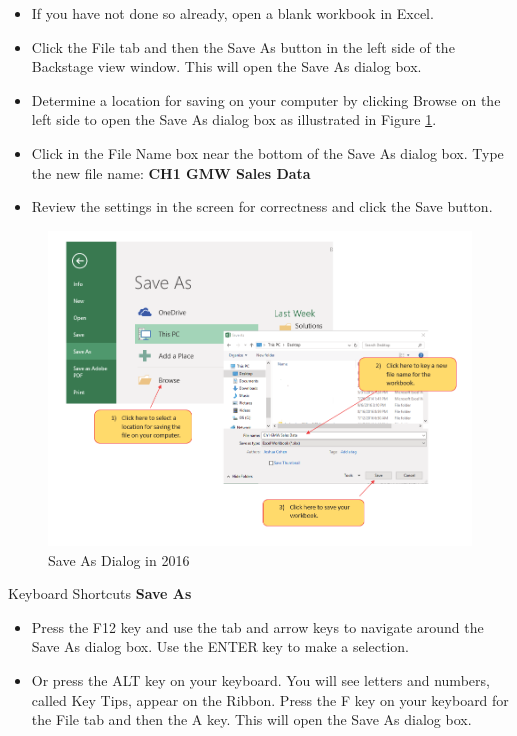 \begin{itemize}
	\item If you have not done so already, open a blank workbook in Excel.
	\item Click the File tab and then the Save As button in the left side of the Backstage view window. This will open the Save As dialog box.
	\item Determine a location for saving on your computer by clicking Browse on the left side to open the Save As dialog box as illustrated in Figure \ref{01:fig12}.
	\item Click in the File Name box near the bottom of the Save As dialog box. Type the new file name: \textbf{CH1 GMW Sales Data}
	\item Review the settings in the screen for correctness and click the Save button.
\end{itemize}

\begin{figure}[H]
	\centering
	\includegraphics[width=\maxwidth{.95\linewidth}]{gfx/ch01_fig12}
	\caption{Save As Dialog in 2016}
	\label{01:fig12}
\end{figure}

\begin{center}
	\begin{shtcutbox}{Keyboard Shortcuts}
		\textbf{Save As}
		\\
		\begin{itemize}
			\setlength{\itemsep}{0pt}
			\setlength{\parskip}{0pt}
			\setlength{\parsep}{0pt}
			
			\item Press the F12 key and use the tab and arrow keys to navigate around the Save As dialog box. Use the ENTER key to make a selection.
			\item Or press the ALT key on your keyboard. You will see letters and numbers, called Key Tips, appear on the Ribbon. Press the F key on your keyboard for the File tab and then the A key. This will open the Save As dialog box.
			
		\end{itemize}
	\end{shtcutbox}
\end{center}

